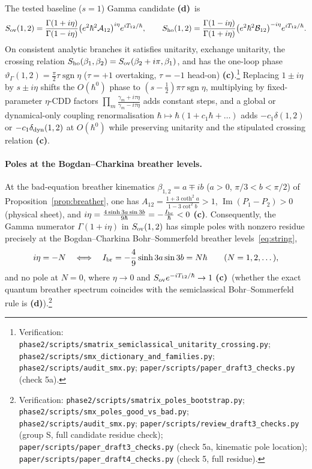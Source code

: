 \documentclass[11pt,a4paper]{article}
\newcommand{\lab}[1]{{\normalfont\sffamily\footnotesize\bfseries(#1)}}
\newcommand{\Lc}{\lab{c}}
\newcommand{\Ld}{\lab{d}}
\newcommand{\scr}[1]{\nolinkurl{#1}}
\newcommand{\chk}[1]{\footnote{\raggedright Verification: #1.}}
\newcommand{\hb}{\hbar}
\newcommand{\sgn}{\operatorname{sgn}}
\theoremstyle{remark}
\begin{document}
The tested baseline ($s=1$) Gamma candidate \Ld\ is
\begin{equation}\label{eq:Sgamma}
S_{\rm ov}(1,2)=\frac{\Gamma(1+i\eta)}{\Gamma(1-i\eta)}\big(e^2\hb^2\mathcal A_{12}\big)^{i\eta}e^{iT_{12}/\hb},\qquad
S_{\rm ho}(1,2)=\frac{\Gamma(1-i\eta)}{\Gamma(1+i\eta)}\big(e^2\hb^2\mathcal B_{12}\big)^{-i\eta}e^{iT_{12}/\hb}.
\end{equation}
On consistent analytic branches it satisfies unitarity, exchange unitarity, the crossing relation $S_{\rm ho}(\beta_1,\beta_2)=S_{\rm ov}(\beta_2+i\pi,\beta_1)$, and has the one-loop phase $\vartheta_\Gamma(1,2)=\frac{\pi}2\tau\sgn\eta$ ($\tau=+1$ overtaking, $\tau=-1$ head-on) \Lc.\chk{\scr{phase2/scripts/smatrix_semiclassical_unitarity_crossing.py}; \scr{phase2/scripts/smx_dictionary_and_families.py}; \scr{phase2/scripts/audit_smx.py}; \scr{paper/scripts/paper_draft3_checks.py} (check 5a)}
Replacing $1\pm i\eta$ by $s\pm i\eta$ shifts the $O(\hb^0)$ phase to $(s-\tfrac12)\pi\tau\sgn\eta$, multiplying by fixed-parameter $\eta$-CDD factors $\prod_m\frac{\gamma_m+i\tau\eta}{\gamma_m-i\tau\eta}$ adds constant steps, and a global or dynamical-only coupling renormalisation $\hb\mapsto\hb(1+c_1\hb+\dots)$ adds $-c_1\delta(1,2)$ or $-c_1\delta_{\rm dyn}(1,2)$ at $O(\hb^0)$ while preserving unitarity and the stipulated crossing relation \Lc.

\paragraph{Poles at the Bogdan--Charkina breather levels.} At the bad-equation breather kinematics $\beta_{1,2}=a\mp ib$ ($a>0$, $\pi/3<b<\pi/2$) of Proposition~\ref{prop:breather}, one has $A_{12}=\frac{1+3\coth^2a}{1-3\cot^2b}>1$, $\operatorname{Im}(P_1-P_2)>0$ (physical sheet), and $i\eta=\frac{4\sinh3a\sin3b}{9\hb}=-\frac{I_{\rm br}}{\hb}<0$ \Lc. Consequently, the Gamma numerator $\Gamma(1+i\eta)$ in $S_{\rm ov}(1,2)$ has simple poles with nonzero residue precisely at the Bogdan--Charkina Bohr--Sommerfeld breather levels~\eqref{eq:string},
\begin{equation}\label{eq:BCpoles}
i\eta=-N\quad\Longleftrightarrow\quad I_{\rm br}=-\frac49\sinh3a\sin3b=N\hb\qquad(N=1,2,\dots),
\end{equation}
and no pole at $N=0$, where $\eta\to0$ and $S_{\rm ov}e^{-iT_{12}/\hb}\to1$ \Lc\ (whether the exact quantum breather spectrum coincides with the semiclassical Bohr--Sommerfeld rule is \Ld).\chk{\scr{phase2/scripts/smatrix_poles_bootstrap.py}; \scr{phase2/scripts/smx_poles_good_vs_bad.py}; \scr{phase2/scripts/audit_smx.py}; \scr{paper/scripts/review_draft3_checks.py} (group S, full candidate residue check); \scr{paper/scripts/paper_draft3_checks.py} (check 5a, kinematic pole location); \scr{paper/scripts/paper_draft4_checks.py} (check 5, full residue)}
\end{document}
